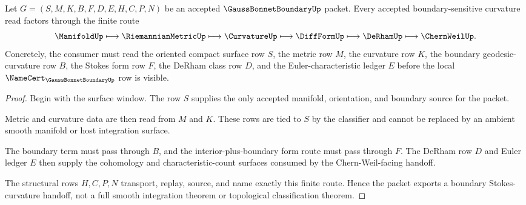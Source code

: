 \begin{theorem}
\label{thm:gauss-bonnet-boundary-stokes-curvature-handoff}
Let $G=(S,M,K,B,F,D,E,H,C,P,N)$ be an accepted $\GaussBonnetBoundaryUp$ packet. Every accepted boundary-sensitive curvature read factors through the finite route
$$
\ManifoldUp \longmapsto \RiemannianMetricUp \longmapsto \CurvatureUp \longmapsto \DiffFormUp \longmapsto \DeRhamUp \longmapsto \ChernWeilUp .
$$
Concretely, the consumer must read the oriented compact surface row $S$, the metric row $M$, the curvature row $K$, the boundary geodesic-curvature row $B$, the Stokes form row $F$, the DeRham class row $D$, and the Euler-characteristic ledger $E$ before the local $\NameCert_{\GaussBonnetBoundaryUp}$ row is visible.
\end{theorem}
\begin{proof}
Begin with the surface window. The row $S$ supplies the only accepted manifold, orientation, and boundary source for the packet.

Metric and curvature data are then read from $M$ and $K$. These rows are tied to $S$ by the classifier and cannot be replaced by an ambient smooth manifold or host integration surface.

The boundary term must pass through $B$, and the interior-plus-boundary form route must pass through $F$. The DeRham row $D$ and Euler ledger $E$ then supply the cohomology and characteristic-count surfaces consumed by the Chern-Weil-facing handoff.

The structural rows $H,C,P,N$ transport, replay, source, and name exactly this finite route. Hence the packet exports a boundary Stokes-curvature handoff, not a full smooth integration theorem or topological classification theorem.
\end{proof}



